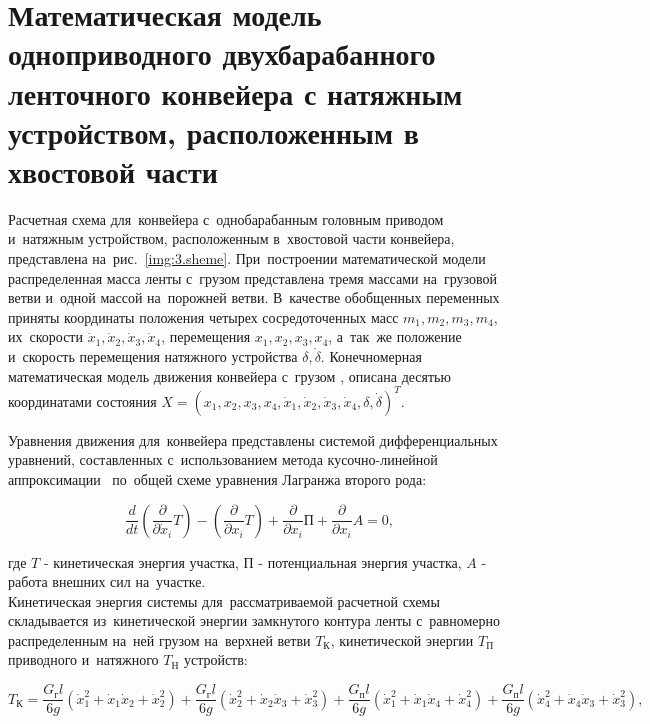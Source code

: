 \section{Математическая модель одноприводного двухбарабанного ленточного конвейера с натяжным устройством, расположенным в хвостовой части} \label{sect3_1}

Расчетная схема для~конвейера с~однобарабанным головным приводом и~натяжным устройством, расположенным в~хвостовой части конвейера, представлена на~рис.~\ref{img:3.sheme}. При~построении математической модели распределенная масса ленты с~грузом представлена тремя массами на~грузовой ветви и~одной массой на~порожней ветви. В~качестве обобщенных переменных приняты координаты положения четырех сосредоточенных масс $m_1, m_2, m_3, m_4$, их~скорости $\dot x_1, \dot x_2, \dot x_3, \dot x_4$, перемещения $x_1, x_2, x_3, x_4$, а~так~же положение и~скорость перемещения натяжного устройства $\delta, \dot \delta$. Конечномерная математическая модель движения конвейера с~грузом \cite{vdmitrieva1}, \cite{vdmitrieva2} описана десятью координатами состояния $X = (x_1, x_2, x_3, x_4, \dot x_1, \dot x_2, \dot x_3, \dot x_4, \delta, \dot \delta)^T$.

Уравнения движения для~конвейера представлены системой дифференциальных уравнений, составленных с~использованием метода кусочно-линейной аппроксимации~\cite{izapenin1} по~общей схеме уравнения Лагранжа второго рода:

$$ \frac{d}{dt} \left( \frac{\partial}{\partial \dot x_i} T \right) - \left( \frac{\partial}{\partial x_i} T \right) + \frac{\partial}{\partial x_i} \text{П} + \frac{\partial}{\partial x_i} A = 0, $$

где $ T $ - кинетическая энергия участка, $ \text{П} $ - потенциальная энергия участка, $ A $ - работа внешних сил на~участке.
\\

Кинетическая энергия системы для~рассматриваемой расчетной схемы складывается из~кинетической энергии замкнутого контура ленты с~равномерно распределенным на~ней грузом на~верхней ветви $T_\text{К}$, кинетической энергии $T_\text{П}$ приводного и~натяжного $T_\text{Н}$ устройств:

$$ T_\text{К} = \frac{G_\text{г}l}{6g}(\dot x_1^2 + \dot x_1 \dot x_2 + \dot x_2^2  ) + \frac{G_\text{г}l}{6g}(\dot x_2^2 + \dot x_2 \dot x_3 + \dot x_3^2) + \frac{G_\text{п}l}{6g}(\dot x_1^2 + \dot x_1 \dot x_4 + \dot x_4^2  ) + \frac{G_\text{п}l}{6g}(\dot x_4^2 + \dot x_4 \dot x_3 + \dot x_3^2  ), $$

